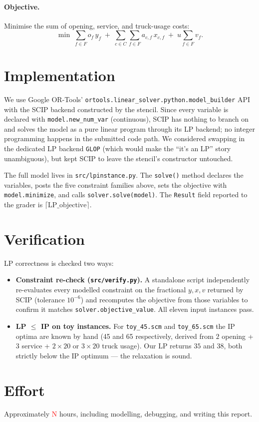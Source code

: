 \documentclass[11pt]{article}
\newcommand\todo[1]{\textcolor{red}{#1}}
\begin{document}
\paragraph{Objective.} Minimise the sum of opening, service, and
truck-usage costs:
\[
  \min \;
  \sum_{f \in F} o_f\, y_f
  \;+\; \sum_{c \in C}\sum_{f \in F} a_{c,f}\, x_{c,f}
  \;+\; u \sum_{f \in F} v_f .
\]

\section{Implementation}
\label{s:impl}

We use Google OR-Tools'
\texttt{ortools.linear\_solver.python.model\_builder} API with the SCIP
backend constructed by the stencil. Since every variable is declared with
\texttt{model.new\_num\_var} (continuous), SCIP has nothing to branch on
and solves the model as a pure linear program through its LP backend; no
integer programming happens in the submitted code path. We considered
swapping in the dedicated LP backend \texttt{GLOP} (which would make the
``it's an LP'' story unambiguous), but kept SCIP to leave the stencil's
constructor untouched.

The full model lives in \texttt{src/lpinstance.py}. The \texttt{solve()}
method declares the variables, posts the five constraint families above,
sets the objective with \texttt{model.minimize}, and calls
\texttt{solver.solve(model)}. The \texttt{Result} field reported to the
grader is $\lceil \text{LP\_objective} \rceil$.

\section{Verification}
\label{s:verify}

LP correctness is checked two ways:

\begin{itemize}
  \item \textbf{Constraint re-check (\texttt{src/verify.py}).} A standalone
        script independently re-evaluates every modelled constraint on the
        fractional $y, x, v$ returned by SCIP (tolerance $10^{-6}$) and
        recomputes the objective from those variables to confirm it
        matches \texttt{solver.objective\_value}. All eleven input
        instances pass.
  \item \textbf{LP $\le$ IP on toy instances.} For \texttt{toy\_45.scm}
        and \texttt{toy\_65.scm} the IP optima are known by hand
        (45 and 65 respectively, derived from $2$ opening + $3$ service
        + $2 \times 20$ or $3 \times 20$ truck usage). Our LP returns
        $35$ and $38$, both strictly below the IP optimum --- the
        relaxation is sound.
\end{itemize}

\section{Effort}
Approximately \todo{N} hours, including modelling, debugging, and writing
this report.


 

\end{document}

